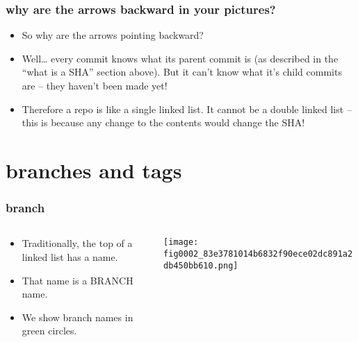 \documentclass[presentation]{beamer}
\begin{document}
\begin{frame}
\frametitle{why are the arrows backward in your pictures?}
\label{sec-2-4}


\begin{itemize}
\item So why are the arrows pointing backward?
\item Well\ldots{} every commit knows what its parent commit is (as described
  in the ``what is a SHA'' section above).  But it can't know what it's
  child commits are -- they haven't been made yet!
\item Therefore a repo is like a single linked list.  It cannot be a
  double linked list -- this is because any change to the contents
  would change the SHA!
\end{itemize}
\end{frame}
\section{branches and tags}
\label{sec-3}
\begin{frame}
\frametitle{branch}
\label{sec-3-1}
\begin{columns}
\begin{column}{0.6\textwidth}
\label{sec-3-1-1}


\begin{itemize}
\item Traditionally, the top of a linked list has a name.
\item That name is a BRANCH
  name.
\item We show branch names in green circles.
\end{itemize}
\end{column}
\begin{column}{0.4\textwidth}
\label{sec-3-1-2}



\texttt{[image: fig0002\_83e3781014b6832f90ece02dc891a2db450bb610.png]}
\end{column}
\end{columns}
\end{frame}
\end{document}
